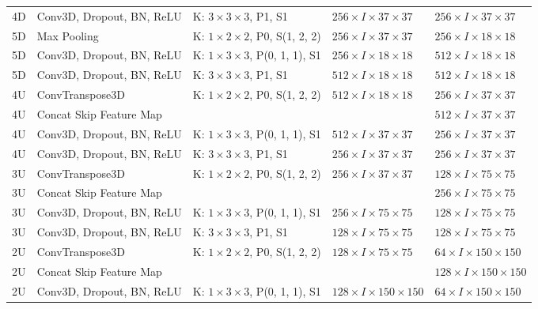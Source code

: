\begin{sidewaystable}[htbp]
\begin{tabular}{l*{4}{l}}
      4D	& Conv3D, Dropout, BN, ReLU & K: $3 \times 3 \times 3$, P1, S1			& $256 \times I \times 37 \times 37$	& $256 \times I \times 37 \times 37$	\\
      5D	& Max Pooling				& K: $1 \times 2 \times 2$, P0, S(1, 2, 2)	& $256 \times I \times 37 \times 37$	& $256 \times I \times 18 \times 18$	\\
      5D	& Conv3D, Dropout, BN, ReLU & K: $1 \times 3 \times 3$, P(0, 1, 1), S1	& $256 \times I \times 18 \times 18$	& $512 \times I \times 18 \times 18$	\\
      5D	& Conv3D, Dropout, BN, ReLU & K: $3 \times 3 \times 3$, P1, S1			& $512 \times I \times 18 \times 18$	& $512 \times I \times 18 \times 18$	\\
      
      4U	& ConvTranspose3D			& K: $1 \times 2 \times 2$, P0, S(1, 2, 2)	& $512 \times I \times 18 \times 18$	& $256 \times I \times 37 \times 37$	\\
      4U	& Concat Skip Feature Map	&											&										& $512 \times I \times 37 \times 37$	\\
      4U	& Conv3D, Dropout, BN, ReLU & K: $1 \times 3 \times 3$, P(0, 1, 1), S1	& $512 \times I \times 37 \times 37$	& $256 \times I \times 37 \times 37$	\\
      4U	& Conv3D, Dropout, BN, ReLU & K: $3 \times 3 \times 3$, P1, S1			& $256 \times I \times 37 \times 37$	& $256 \times I \times 37 \times 37$	\\
      3U	& ConvTranspose3D			& K: $1 \times 2 \times 2$, P0, S(1, 2, 2)	& $256 \times I \times 37 \times 37$	& $128 \times I \times 75 \times 75$	\\
      3U	& Concat Skip Feature Map	&											&										& $256 \times I \times 75 \times 75$	\\
      3U	& Conv3D, Dropout, BN, ReLU & K: $1 \times 3 \times 3$, P(0, 1, 1), S1	& $256 \times I \times 75 \times 75$	& $128 \times I \times 75 \times 75$	\\
      3U	& Conv3D, Dropout, BN, ReLU & K: $3 \times 3 \times 3$, P1, S1			& $128 \times I \times 75 \times 75$	& $128 \times I \times 75 \times 75$	\\
      2U	& ConvTranspose3D			& K: $1 \times 2 \times 2$, P0, S(1, 2, 2)	& $128 \times I \times 75 \times 75$	& $64 \times I \times 150 \times 150$	\\
      2U	& Concat Skip Feature Map	&											&										& $128 \times I \times 150 \times 150$	\\
      2U	& Conv3D, Dropout, BN, ReLU & K: $1 \times 3 \times 3$, P(0, 1, 1), S1	& $128 \times I \times 150 \times 150$	& $64 \times I \times 150 \times 150$	\\

\end{tabular}
\end{sidewaystable}
